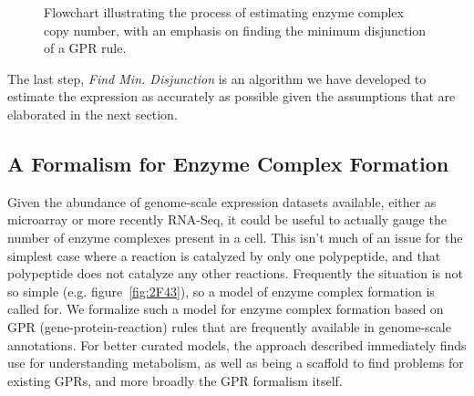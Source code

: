 \vspace{5 mm} 
\begin{figure}
\caption{Flowchart illustrating the process of estimating enzyme
complex copy number, with an emphasis on finding the minimum
disjunction of a GPR rule.}
\label{ECCN_flowchart}
\end{figure}

The last step, \emph{Find Min. Disjunction} is an algorithm we have
developed to estimate the expression as accurately as possible given
the assumptions that are elaborated in the next section.

\subsection{A Formalism for Enzyme Complex Formation}

Given the abundance of genome-scale expression datasets available,
either as microarray or more recently RNA-Seq, it could be useful to
actually gauge the number of enzyme complexes present in a cell. This
isn't much of an issue for the simplest case where a reaction is
catalyzed by only one polypeptide, and that polypeptide does not
catalyze any other reactions.  Frequently the situation is not so
simple (e.g. figure~\ref{fig:2F43}), so a model of enzyme complex
formation is called for.  We formalize such a model for enzyme complex
formation based on GPR (gene-protein-reaction) rules that are
frequently available in genome-scale annotations. For better curated
models, the approach described immediately finds use for understanding
metabolism, as well as being a scaffold to find problems for existing
GPRs, and more broadly the GPR formalism itself.

